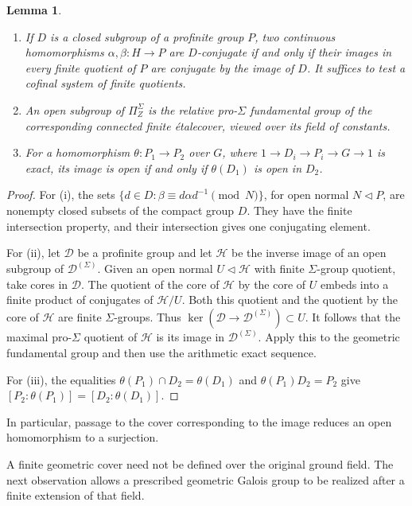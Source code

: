 \documentclass[11pt,a4paper]{article}
\numberwithin{equation}{section}
\theoremstyle{plain}
\newtheorem{lemma}[theorem]{Lemma}
\theoremstyle{definition}
\theoremstyle{remark}
\newcommand{\etale}{\'etale}
\begin{document}
\begin{lemma}
\label{lem:cover-tools}
\begin{enumerate}
\item If $D$ is a closed subgroup of a profinite group $P$, two continuous
homomorphisms $\alpha,\beta:H\to P$ are $D$-conjugate if and only if their
images in every finite quotient of $P$ are conjugate by the image of $D$.
It suffices to test a cofinal system of finite quotients.
\item An open subgroup of $\Pi_Z^\Sigma$ is the relative pro-$\Sigma$
fundamental group of the corresponding connected finite \etale cover,
viewed over its field of constants.
\item For a homomorphism $\theta:P_1\to P_2$ over $G$, where
$1\to D_i\to P_i\to G\to1$ is exact, its image is open if and only if
$\theta(D_1)$ is open in $D_2$.
\end{enumerate}
\end{lemma}
\begin{proof}
For (i), the sets
$\{d\in D:\beta\equiv d\alpha d^{-1}\pmod N\}$, for open normal
$N\triangleleft P$, are nonempty closed subsets of the compact group $D$.
They have the finite intersection property, and their intersection gives
one conjugating element.

For (ii), let $\mathcal D$ be a profinite group and let $\mathcal H$ be
the inverse image of an open subgroup of $\mathcal D^{(\Sigma)}$.
Given an open normal $U\triangleleft\mathcal H$ with finite
$\Sigma$-group quotient, take cores in $\mathcal D$. The quotient of the
core of $\mathcal H$ by the core of $U$ embeds into a finite product of
conjugates of $\mathcal H/U$. Both this quotient and the quotient by the
core of $\mathcal H$ are finite $\Sigma$-groups. Thus
$\ker(\mathcal D\to\mathcal D^{(\Sigma)})\subset U$.
It follows that the maximal pro-$\Sigma$ quotient of $\mathcal H$ is
its image in $\mathcal D^{(\Sigma)}$.
Apply this to the geometric fundamental group and then
use the arithmetic exact sequence.

For (iii), the equalities
$\theta(P_1)\cap D_2=\theta(D_1)$ and $\theta(P_1)D_2=P_2$ give
$[P_2:\theta(P_1)]=[D_2:\theta(D_1)]$.
\end{proof}

In particular, passage to the cover corresponding to the image reduces an
open homomorphism to a surjection.

A finite geometric cover need not be defined over the original ground
field. The next observation allows a prescribed geometric Galois group to
be realized after a finite extension of that field.
\end{document}
